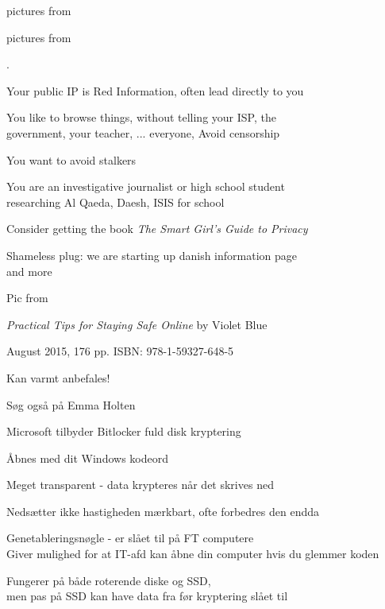 \documentclass[20pt,landscape,a4paper]{foils}
\begin{document}
\centerline{pictures from }



\centerline{pictures from }

.
\begin{list2}
\item Your public IP is {\color{red}Red Information}, often lead directly to you
\item You like to browse things, without telling your ISP, the\\
government, your teacher, ... everyone, Avoid censorship
\item You want to avoid stalkers
\item You are an investigative journalist or high school student\\
researching Al Qaeda, Daesh, ISIS for school
\item Consider getting the book \emph{The Smart Girl's Guide to Privacy}\\ 
\end{list2}

Shameless plug: we are starting up danish information page\\
and more 

Pic from 




\emph{Practical Tips for Staying Safe Online}
by Violet Blue

August 2015, 176 pp.
ISBN: 978-1-59327-648-5

Kan varmt anbefales!

Søg også på Emma Holten



\begin{list2}
\item Microsoft tilbyder Bitlocker fuld disk kryptering
\item Åbnes med dit Windows kodeord
\item Meget transparent - data krypteres når det skrives ned
\item Nedsætter ikke hastigheden mærkbart, ofte forbedres den endda
\item Genetableringsnøgle - er slået til på FT computere\\
Giver mulighed for at IT-afd kan åbne din computer hvis du glemmer koden
\item Fungerer på både roterende diske og SSD, \\
men pas på SSD kan have data fra før kryptering slået til
\end{list2}
\end{document}
